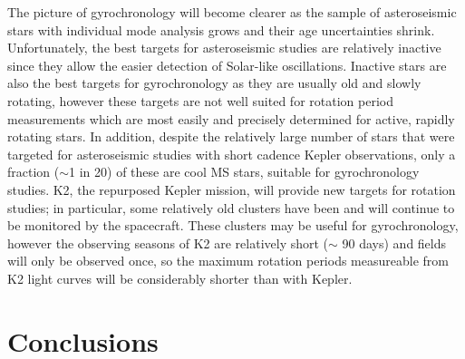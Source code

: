 \documentclass[10pt,preprint]{aastex}
\begin{document}
The picture of gyrochronology will become clearer as the sample of asteroseismic stars with individual mode analysis grows and their age uncertainties shrink.
Unfortunately, the best targets for asteroseismic studies are relatively inactive since they allow the easier detection of Solar-like oscillations.
Inactive stars are also the best targets for gyrochronology as they are usually old and slowly rotating, however these targets are not well suited for rotation period measurements which are most easily and precisely determined for active, rapidly rotating stars.
In addition, despite the relatively large number of stars that were targeted for asteroseismic studies with short cadence Kepler observations, only a fraction ($\sim$1 in 20) of these are cool MS stars, suitable for gyrochronology studies.
K2, the repurposed Kepler mission, will provide new targets for rotation studies; in particular, some relatively old clusters have been and will continue to be monitored by the spacecraft.
These clusters may be useful for gyrochronology, however the observing seasons of K2 are relatively short ($\sim$ 90 days) and fields will only be observed once, so the maximum rotation periods measureable from K2 light curves will be considerably shorter than with Kepler.

\section{Conclusions}
\label{sec:conclusions}
\end{document}
